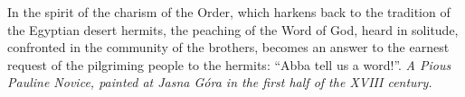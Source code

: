 \pagestyle{empty}
\hspace{0pt}
\vfill

In the spirit of the charism of the Order, which harkens back to the tradition of the Egyptian desert hermits, the peaching of the Word of God, heard in solitude, confronted in the community of the brothers, becomes an answer to the earnest request of the pilgriming people to the hermits: ``Abba tell us a word!''.
\vfill
\textit{A Pious Pauline Novice, painted at Jasna Góra in the first half of the XVIII century.}
\hspace{0pt}
\newpage
